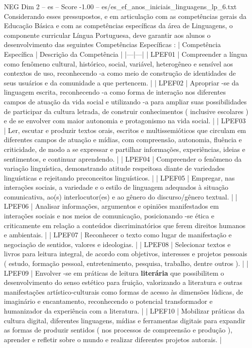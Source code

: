 \begin{textsample}{NEG Dim 2 – es – Score -1.00 – es/es\_ef\_anos\_iniciais\_linguagens\_lp\_6.txt}  \label{ex:f2_neg_078}
Considerando esses pressupostos, e em articulação com as competências gerais da Educação Básica e com as competências específicas da área de Linguagens, o componente curricular Língua Portuguesa, deve garantir aos alunos o desenvolvimento das seguintes Competências Específicas : | Competência Específica | Descrição da Competência | |---|---| | LPEF01 | Compreender a língua como fenômeno cultural, histórico, social, variável, heterogêneo e sensível aos contextos de uso, reconhecendo -a como meio de construção de identidades de seus usuários e da comunidade a que pertencem. | | LPEF02 | Apropriar -se da linguagem escrita, reconhecendo -a como forma de interação nos diferentes campos de atuação da vida social e utilizando -a para ampliar suas possibilidades de participar da cultura letrada, de construir conhecimentos ( inclusive escolares ) e de se envolver com maior autonomia e protagonismo na vida social. | | LPEF03 | Ler, escutar e produzir textos orais, escritos e multissemióticos que circulam em diferentes campos de atuação e mídias, com compreensão, autonomia, fluência e criticidade, de modo a se expressar e partilhar informações, experiências, ideias e sentimentos, e continuar aprendendo. | | LPEF04 | Compreender o fenômeno da variação linguística, demonstrando atitude respeitosa diante de variedades linguísticas e rejeitando preconceitos linguísticos. | | LPEF05 | Empregar, nas interações sociais, a variedade e o estilo de linguagem adequados à situação comunicativa, ao(s) interlocutor(es) e ao gênero do discurso/gênero textual. | | LPEF06 | Analisar informações, argumentos e opiniões manifestados em interações sociais e nos meios de comunicação, posicionando -se ética e criticamente em relação a conteúdos discriminatórios que ferem direitos humanos e ambientais. | | LPEF07 | Reconhecer o texto como lugar de manifestação e negociação de sentidos, valores e ideologias. | | LPEF08 | Selecionar textos e livros para leitura integral, de acordo com objetivos, interesses e projetos pessoais ( estudo, formação pessoal, entretenimento, pesquisa, trabalho, dentre outros ). | | LPEF09 | Envolver -se em práticas de leitura \textbf{literária} que possibilitem o desenvolvimento do senso estético para fruição, valorizando a literatura e outras manifestações artístico-culturais como formas de acesso às dimensões lúdicas, de imaginário e encantamento, reconhecendo o potencial transformador e humanizador da experiência com a literatura. | | LPEF10 | Mobilizar práticas da cultura digital, diferentes linguagens, mídias e ferramentas digitais para expandir as formas de produzir sentidos ( nos processos de compreensão e produção ), aprender e refletir sobre o mundo e realizar diferentes projetos autorais. |

\end{textsample}
